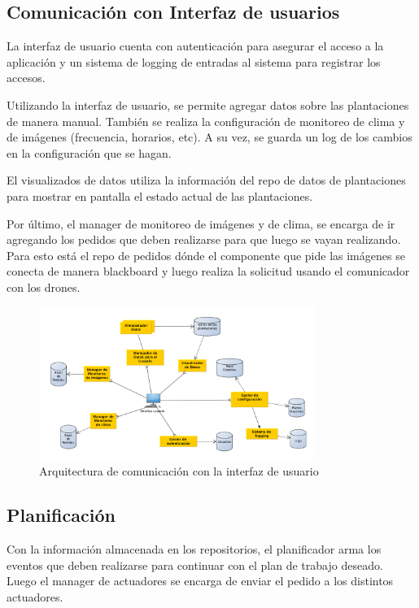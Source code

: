 \subsection{Comunicación con Interfaz de usuarios}

La interfaz de usuario cuenta con autenticación para asegurar el acceso a la aplicación y un sistema de logging de entradas al sistema para registrar los accesos.

Utilizando la interfaz de usuario, se permite agregar datos sobre las plantaciones de manera manual. También se realiza la configuración de monitoreo de clima y de imágenes (frecuencia, horarios, etc). A su vez, se guarda un log de los cambios en la configuración que se hagan.

El visualizados de datos utiliza la información del repo de datos de plantaciones para mostrar en pantalla el estado actual de las plantaciones.

Por último, el manager de monitoreo de imágenes  y de clima, se encarga de ir agregando los pedidos que deben realizarse para que luego se vayan realizando. Para esto está el repo de pedidos dónde el componente que pide las imágenes se conecta de manera blackboard y luego realiza la solicitud usando el comunicador con los drones.

\begin{figure}[h!]
  \centering
  \includegraphics[width=0.8\textwidth]{./images/arq_interfazusuario.png}
  \caption{Arquitectura de comunicación con la interfaz de usuario}
  \label{fig:clases4}
\end{figure}

\subsection{Planificación}

Con la información almacenada en los repositorios, el planificador arma los eventos que deben realizarse para continuar con el plan de trabajo deseado. Luego el manager de actuadores se encarga de enviar el pedido a los distintos actuadores.

